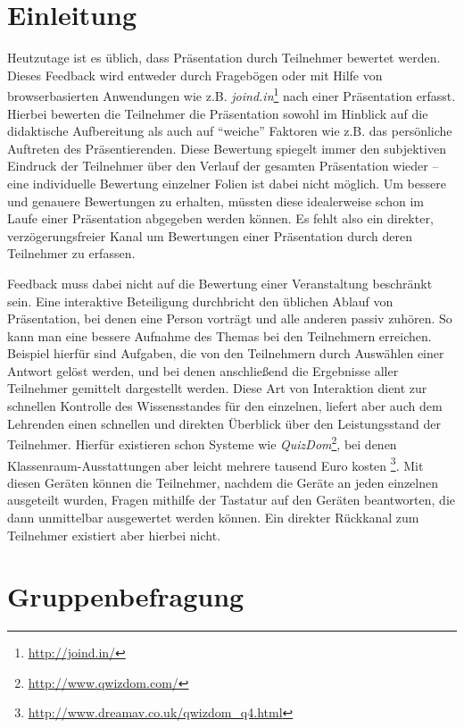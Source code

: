 \section{Einleitung}

Heutzutage ist es üblich, dass Präsentation durch Teilnehmer bewertet werden. Dieses Feedback wird entweder durch Fragebögen oder mit Hilfe von browserbasierten Anwendungen wie z.B. \emph{joind.in}\footnote{\url{http://joind.in/}} nach einer Präsentation erfasst. Hierbei bewerten die Teilnehmer die Präsentation sowohl im Hinblick auf die didaktische Aufbereitung als auch auf "`weiche"' Faktoren wie z.B. das persönliche Auftreten des Präsentierenden. Diese Bewertung spiegelt immer den subjektiven Eindruck der Teilnehmer über den Verlauf der gesamten Präsentation wieder -- eine individuelle Bewertung einzelner Folien ist dabei nicht möglich. Um bessere und genauere Bewertungen zu erhalten, müssten diese idealerweise schon im Laufe einer Präsentation abgegeben werden können. Es fehlt also ein direkter, verzögerungsfreier Kanal um Bewertungen einer Präsentation durch deren Teilnehmer zu erfassen.

Feedback muss dabei nicht auf die Bewertung einer Veranstaltung beschränkt sein. Eine interaktive Beteiligung durchbricht den üblichen Ablauf von Präsentation, bei denen eine Person vorträgt und alle anderen passiv zuhören. So kann man eine bessere Aufnahme des Themas bei den Teilnehmern erreichen. Beispiel hierfür sind Aufgaben, die von den Teilnehmern durch Auswählen einer Antwort gelöst werden, und bei denen anschließend die Ergebnisse aller Teilnehmer gemittelt dargestellt werden. Diese Art von Interaktion dient zur schnellen Kontrolle des Wissensstandes für den einzelnen, liefert aber auch dem Lehrenden einen schnellen und direkten Überblick über den Leistungsstand der Teilnehmer. Hierfür existieren schon Systeme wie \emph{QuizDom}\footnote{\url{http://www.qwizdom.com/}}, bei denen Klassenraum-Ausstattungen aber leicht mehrere tausend Euro kosten \footnote{\url{http://www.dreamav.co.uk/qwizdom_q4.html}}. Mit diesen Geräten können die Teilnehmer, nachdem die Geräte an jeden einzelnen ausgeteilt wurden, Fragen mithilfe der Tastatur auf den Geräten beantworten, die dann unmittelbar ausgewertet werden können. Ein direkter Rückkanal zum Teilnehmer existiert aber hierbei nicht.

\section{Gruppenbefragung}

